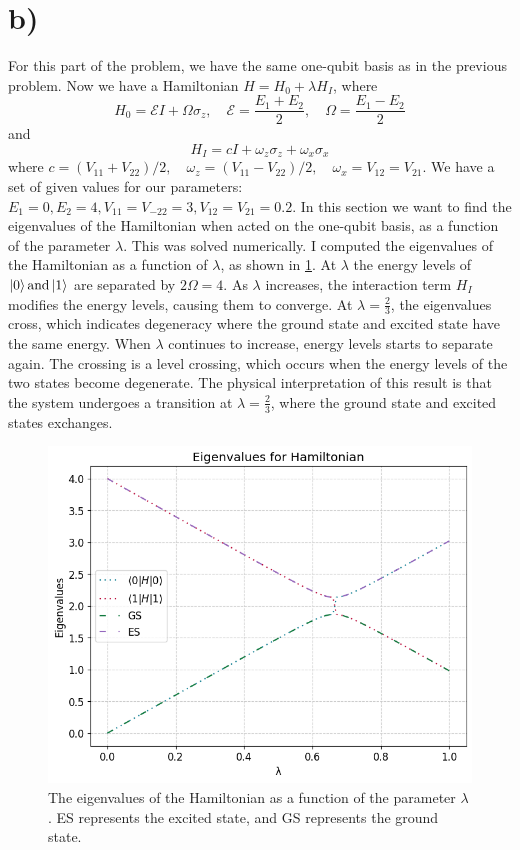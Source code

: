 \documentclass[11pt, letterpaper, titlepage]{article}
\begin{document}
\section{b)}
For this part of the problem, we have the same one-qubit basis as in the previous problem. Now we have a Hamiltonian \(H = H_0 + λH_I\), where
\[
H_0 = \mathcal{E} I + Ω σ_z, \quad \mathcal{E} = \frac{E_{1} + E_2}{2}, \quad Ω = \frac{E_1 - E_2}{2}
\]
and 
\[
H_I = cI + ω_zσ_z + ω_xσ_x
\]
where \(
c = (V_{11}+V_{22})/2, \quad ω_z = (V_{11}-V_{22})/2, \quad ω_x = V_{12}=V_{21}
\). We have a set of given values for our parameters:
\(E_1=0, E_2=4, V_{11}=V_{-22}=3, V_{12} = V_{21}=0.2\). \newline
In this section we want to find the eigenvalues of the Hamiltonian when acted on the one-qubit basis, as a function of the parameter \(λ\). This was solved numerically. 
I computed the eigenvalues of the Hamiltonian as a function of \(λ\), as shown in \ref{fig:Eigvals}. At \(λ\) the energy levels of \(\ket{0} \text{and} \ket{1}\) are separated by \(2Ω=4\). As \(λ\) increases, the interaction term \(H_I\) modifies the energy levels, causing them to converge. At \(λ=\frac{2}{3}\), the eigenvalues cross, which indicates degeneracy where the ground state and excited state have the same energy. When \(λ\) continues to increase, energy levels starts to separate again. \newline
The crossing is a level crossing, which occurs when the energy levels of the two states become degenerate. The physical interpretation of this result is that the system undergoes a transition at \(λ=\frac{2}{3}\), where the ground state and excited states exchanges. \newline
\begin{figure}
  \begin{center}
        \includegraphics[scale=0.6]{Eigvals.png}
        \caption{The eigenvalues of the Hamiltonian as a function of the parameter \(λ\). ES represents the excited state, and GS represents the ground state.}
  \end{center}
  \label{fig:Eigvals}
\end{figure}\newpage
\end{document}
